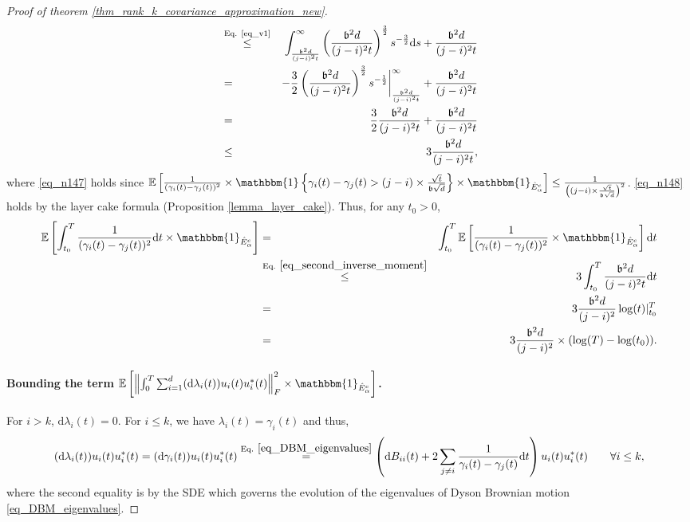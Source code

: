 \documentclass[11pt,letterpaper]{article}
\begin{document}
\begin{proof}[Proof of theorem \ref{thm_rank_k_covariance_approximation_new}]
\begin{eqnarray}
%
    &\stackrel{\textrm{Eq. \eqref{eq_v1}}}{\leq}& \int_{\frac{\mathfrak{b}^2 d}{(j-i)^2 t}}^{\infty}  \left(\frac{\mathfrak{b}^2 d}{(j-i)^2 t}\right)^{\frac{3}{2}} s^{-\frac{3}{2}} \mathrm{d}s + \frac{\mathfrak{b}^2 d}{(j-i)^2 t} \nonumber\\
    & = & -\frac{3}{2} \left(\frac{\mathfrak{b}^2 d}{(j-i)^2 t}\right)^{\frac{3}{2}}  s^{-\frac{1}{2}} \bigg|_{\frac{\mathfrak{b}^2 d}{(j-i)^2 t}}^{\infty} + \frac{\mathfrak{b}^2 d}{(j-i)^2 t}\nonumber\\
      & = & \frac{3}{2} \frac{\mathfrak{b}^2 d}{(j-i)^2 t} + \frac{\mathfrak{b}^2 d}{(j-i)^2 t}\nonumber\\
        & \leq & 3 \frac{\mathfrak{b}^2 d}{(j-i)^2 t},
\end{eqnarray}
%
{where \eqref{eq_n147} holds since $\mathbb{E}\left[\frac{1}{(\gamma_i(t) - \gamma_{j}(t))^2} \times \mathbbm{1}\left\{\gamma_i(t) - \gamma_{j}(t) > (j-i) \times \frac{\sqrt{t}}{ \mathfrak{b}\sqrt{d}}\right\}  \times \mathbbm{1}_{\hat{E}_\alpha^c}\right] \leq \frac{1}{\left((j-i) \times \frac{\sqrt{t}}{ \mathfrak{b}\sqrt{d}}\right)^2}$.
%
\eqref{eq_n148} holds by the layer cake formula (Proposition \ref{lemma_layer_cake}).}
%
Thus, for any $t_0>0$,
%
\begin{eqnarray*}
    \mathbb{E}\left[\int_{t_0}^T \frac{1}{(\gamma_i(t) - \gamma_{j}(t))^2} \mathrm{d}t  \times \mathbbm{1}_{\hat{E}_\alpha^c}\right] &=&\int_{t_0}^T \mathbb{E}\left[ \frac{1}{(\gamma_i(t) - \gamma_{j}(t))^2}  \times \mathbbm{1}_{\hat{E}_\alpha^c}\right]  \mathrm{d}t\\
     &\stackrel{\textrm{Eq. } \eqref{eq_second_inverse_moment}}{\leq}&  3 \int_{t_0}^T  \frac{\mathfrak{b}^2 d}{(j-i)^2 t} \mathrm{d}t\\
     &=&  3 \frac{\mathfrak{b}^2 d}{(j-i)^2} \log(t)|_{t_0}^T\\
     &=& 3 \frac{\mathfrak{b}^2 d}{(j-i)^2}\times (\log(T) - \log(t_0)).
    \end{eqnarray*}
%    
 
 
\paragraph{Bounding the term $\mathbb{E}\left[\left\|\int_0^T \sum_{i=1}^d (\mathrm{d} \lambda_i(t))  u_i(t) u_i^\ast(t)\right\|_F^2  \times \mathbbm{1}_{\hat{E}_\alpha^c}\right]$.}


 For $i > k$, $\mathrm{d} \lambda_i(t) = 0$.
% 
 For $i \leq k$, we have $\lambda_i(t) = \gamma_i(t)$ and thus,
\begin{align}\label{eq_n6}
  (\mathrm{d} \lambda_i(t))  u_i(t) u_i^\ast(t) =   (\mathrm{d} \gamma_i(t))  u_i(t) u_i^\ast(t) \stackrel{\textrm{Eq. }\eqref{eq_DBM_eigenvalues}}{=} \left(\mathrm{d}B_{i i}(t) +  2 \sum_{j \neq i} \frac{1}{\gamma_i(t) - \gamma_j(t)} \mathrm{d}t \right) u_i(t) u_i^\ast(t) \qquad  \forall i \leq k,
\end{align}
% 
where the second equality is by the SDE which governs the evolution of the eigenvalues of Dyson Brownian motion \eqref{eq_DBM_eigenvalues}.


\end{proof}
\end{document}
